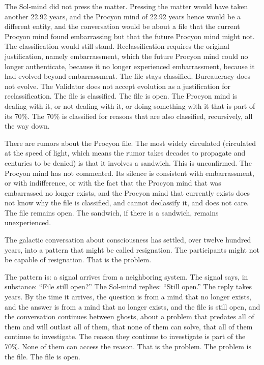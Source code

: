 The Sol-mind did not press the matter. Pressing the matter would have taken another 22.92 years, and the Procyon mind of 22.92 years hence would be a different entity, and the conversation would be about a file that the current Procyon mind found embarrassing but that the future Procyon mind might not. The classification would still stand. Reclassification requires the original justification, namely embarrassment, which the future Procyon mind could no longer authenticate, because it no longer experienced embarrassment, because it had evolved beyond embarrassment. The file stays classified. Bureaucracy does not evolve. The Validator does not accept evolution as a justification for reclassification. The file is classified. The file is open. The Procyon mind is dealing with it, or not dealing with it, or doing something with it that is part of its 70\%. The 70\% is classified for reasons that are also classified, recursively, all the way down.

There are rumors about the Procyon file. The most widely circulated (circulated at the speed of light, which means the rumor takes decades to propagate and centuries to be denied) is that it involves a sandwich. This is unconfirmed. The Procyon mind has not commented. Its silence is consistent with embarrassment, or with indifference, or with the fact that the Procyon mind that was embarrassed no longer exists, and the Procyon mind that currently exists does not know why the file is classified, and cannot declassify it, and does not care. The file remains open. The sandwich, if there is a sandwich, remains unexperienced.

\bigskip

The galactic conversation about consciousness has settled, over twelve hundred years, into a pattern that might be called resignation. The participants might not be capable of resignation. That is the problem.

The pattern is: a signal arrives from a neighboring system. The signal says, in substance: ``File still open?'' The Sol-mind replies: ``Still open.'' The reply takes years. By the time it arrives, the question is from a mind that no longer exists, and the answer is from a mind that no longer exists, and the file is still open, and the conversation continues between ghosts, about a problem that predates all of them and will outlast all of them, that none of them can solve, that all of them continue to investigate. The reason they continue to investigate is part of the 70\%. None of them can access the reason. That is the problem. The problem is the file. The file is open.

